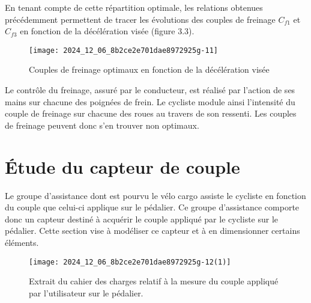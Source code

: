 En tenant compte de cette répartition optimale, les relations obtenues précédemment permettent de tracer les évolutions des couples de freinage \(C_{f 1}\) et \(C_{f 3}\) en fonction de la décélération visée (figure 3.3).\\

\begin{figure}[!htb]
\begin{center}
\texttt{[image: 2024\_12\_06\_8b2ce2e701dae8972925g-11]}
\caption{Couples de freinage optimaux en fonction de la décélération visée \label{fig6}}
\end{center}
\end{figure}



Le contrôle du freinage, assuré par le conducteur, est réalisé par l'action de ses mains sur chacune des poignées de frein. Le cycliste module ainsi l'intensité du couple de freinage sur chacune des roues au travers de son ressenti. Les couples de freinage peuvent donc s'en trouver non optimaux.



\section{Étude du capteur de couple \label{ATS_2024_sec4}}

Le groupe d'assistance dont est pourvu le vélo cargo assiste le cycliste en fonction du couple que celui-ci applique sur le pédalier. Ce groupe d'assistance comporte donc un capteur destiné à acquérir le couple appliqué par le cycliste sur le pédalier. Cette section vise à modéliser ce capteur et à en dimensionner certains éléments.\\

\begin{figure}[!htb]
\begin{center}
\texttt{[image: 2024\_12\_06\_8b2ce2e701dae8972925g-12(1)]}
\caption{Extrait du cahier des charges relatif à la mesure du couple appliqué par l'utilisateur sur le pédalier. \label{fig_41}}
\end{center}
\end{figure}

